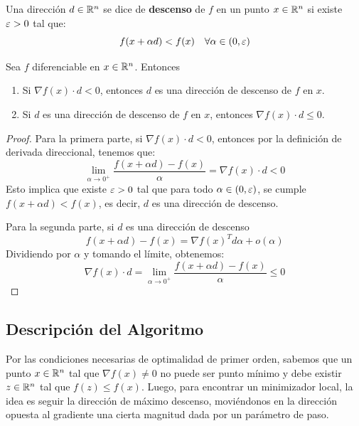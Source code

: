 \begin{definition}
    Una dirección \( d \in \mathbb{R}^n \) se dice de \textbf{descenso} de \( f \) en un punto \( x \in \mathbb{R}^n \) si existe \( \varepsilon > 0 \) tal que:
    \[
        f(x + \alpha d) < f(x) \quad \forall \alpha \in (0, \varepsilon)
    \]
\end{definition}

\begin{lemma}
    Sea \( f \) diferenciable en \( x \in \mathbb{R}^n \). Entonces \begin{enumerate}
        \item Si \( \nabla f(x) \cdot d < 0 \), entonces \( d \) es una dirección de descenso de \( f \) en \( x \).
        \item Si \( d \) es una dirección de descenso de \( f \) en \( x \), entonces \( \nabla f(x) \cdot d \leq 0 \).
    \end{enumerate}

    \begin{proof}
        Para la primera parte, si \( \nabla f(x) \cdot d < 0 \), entonces por la definición de derivada direccional, tenemos que:
        \[
            \lim_{\alpha \to 0^+} \frac{f(x + \alpha d) - f(x)}{\alpha} = \nabla f(x) \cdot d < 0
        \]
        Esto implica que existe \( \varepsilon > 0 \) tal que para todo \( \alpha \in (0, \varepsilon) \), se cumple \( f(x + \alpha d) < f(x) \), es decir, \( d \) es una dirección de descenso.

        Para la segunda parte, si \( d \) es una dirección de descenso \[
            f(x + \alpha d) - f(x) = \nabla f(x)^T d \alpha + o(\alpha)
        \]
        Dividiendo por \( \alpha \) y tomando el límite, obtenemos:
        \[
            \nabla f(x) \cdot d = \lim_{\alpha \to 0^+} \frac{f(x + \alpha d) - f(x)}{\alpha} \leq 0
        \]
    \end{proof}
\end{lemma}

\subsection{Descripción del Algoritmo}

Por las condiciones necesarias de optimalidad de primer orden, sabemos que un punto \( x \in \mathbb{R}^n \) tal que \( \nabla f(x) \neq 0 \) no puede ser punto mínimo y debe existir \( z \in \mathbb{R}^n \) tal que \( f(z) \leq f(x) \).
Luego, para encontrar un minimizador local, la idea es seguir la dirección de máximo descenso, moviéndonos en la dirección opuesta al gradiente una cierta magnitud dada por un parámetro de paso.

